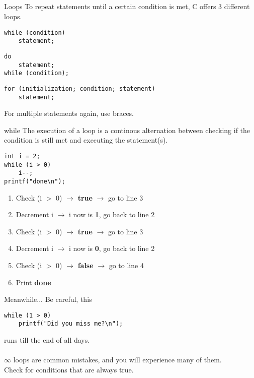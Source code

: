 \subsection{}
\begin{frame}[fragile]{Loops}
	To repeat statements until a certain condition is met, C offers 3 different loops.
	\begin{lstlisting}[numbers=none,basicstyle=\itshape\footnotesize]
while (condition)
	statement;
\end{lstlisting}
	\begin{lstlisting}[numbers=none,basicstyle=\itshape\footnotesize]
do
	statement;
while (condition);
\end{lstlisting}
	\begin{lstlisting}[numbers=none,basicstyle=\itshape\footnotesize]
for (initialization; condition; statement)
	statement;
\end{lstlisting}
	For multiple statements again, use braces.
\end{frame}
\begin{frame}[fragile]{while}
	The execution of a loop is a continous alternation between checking if the condition is still met and executing the statement(s).
	\begin{lstlisting}
int i = 2;
while (i > 0)
	i--;
printf("done\n");
\end{lstlisting}
	\begin{enumerate}[<+(1)->]
		\item Check (i $>$ 0) $\rightarrow$ \textbf{true} $\rightarrow$ go to line 3
		\item Decrement i $\rightarrow$ i now is \textbf{1}, go back to line 2
		\item Check (i $>$ 0) $\rightarrow$ \textbf{true} $\rightarrow$ go to line 3
		\item Decrement i $\rightarrow$ i now is \textbf{0}, go back to line 2
		\item Check (i $>$ 0) $\rightarrow$ \textbf{false} $\rightarrow$ go to line 4
		\item Print \textbf{done}
	\end{enumerate}
\end{frame}
\begin{frame}[fragile]{Meanwhile...}
	Be careful, this
	\begin{lstlisting}[numbers=none]
while (1 > 0)
	printf("Did you miss me?\n");
\end{lstlisting}
runs till the end of all days.\\
\ \\$\infty$ loops are common mistakes, and you will experience many of them.\\
Check for conditions that are always true.
\end{frame}
